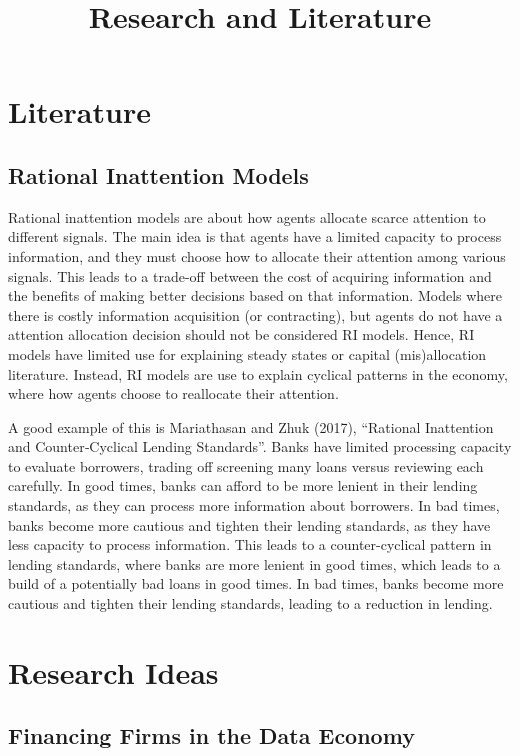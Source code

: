 \documentclass[12pt]{article}
\title{Research and Literature}
\date{}
\begin{document}
\maketitle


\section*{Literature}
\subsection*{Rational Inattention Models} 

Rational inattention models are about how agents allocate scarce attention to different signals. The main idea is that agents have a limited capacity to process information, and they must choose how to allocate their attention among various signals. This leads to a trade-off between the cost of acquiring information and the benefits of making better decisions based on that information. Models where there is costly information acquisition (or contracting), but agents do not have a attention allocation decision should not be considered RI models. Hence, RI models have limited use for explaining steady states or capital (mis)allocation literature. Instead, RI models are use to explain cyclical patterns in the economy, where how agents choose to reallocate their attention. 

A good example of this is Mariathasan and Zhuk (2017), “Rational Inattention and Counter‐Cyclical Lending Standards”. Banks have limited processing capacity to evaluate borrowers, trading off screening many loans versus reviewing each carefully. In good times, banks can afford to be more lenient in their lending standards, as they can process more information about borrowers. In bad times, banks become more cautious and tighten their lending standards, as they have less capacity to process information. This leads to a counter-cyclical pattern in lending standards, where banks are more lenient in good times, which leads to a build of a potentially bad loans in good times. In bad times, banks become more cautious and tighten their lending standards, leading to a reduction in lending. 

\section*{Research Ideas}

\subsection*{Financing Firms in the Data Economy}
\end{document}
